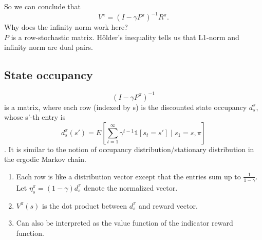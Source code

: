 \documentclass{report}
\begin{document}
So we can conclude that 
\begin{equation}
    V^{\pi}=(I-\gamma P^{\pi})^{-1}R^{\pi}.
\end{equation}
Why does the infinity norm work here?\\
$P$ is a row-stochastic matrix. 
Hölder's inequality tells us that L1-norm and infinity norm are dual pairs.

\subsection{State occupancy}
\[(I-\gamma P^{\pi})^{-1}\] is a matrix, where each row (indexed by s) is the discounted state occupancy $d_s^{\pi}$, whose s'-th entry is \[d_s^{\pi}(s')=E[\sum_{t=1}^{\infty}\gamma^{t-1} \mathbb{1}[s_t=s'] \mid s_1=s,\pi]\]. It is similar to the notion of occupancy distribution/stationary distribution in the ergodic Markov chain.
\begin{enumerate}
    \item Each row is like a distribution vector except that the entries sum up to $\frac{1}{1-\gamma}$. Let $\eta_{s}^{\pi}=(1-\gamma)d_s^{\pi}$ denote the normalized vector.
    \item $V^{\pi}(s)$ is the dot product between $d_s^{\pi}$ and reward vector.
    \item Can also be interpreted as the value function of the indicator reward function.
\end{enumerate}
\end{document}
